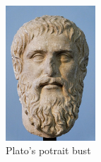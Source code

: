 \documentclass[11pt]{article}
\begin{document}



		\begin{figure}[ht]
			\centering
			\includegraphics[width=0.3\textwidth, keepaspectratio]{images/plato_bust.jpg}
			\caption{Plato's potrait bust}
			\label{img:platobust}
		\end{figure}

\end{document}
